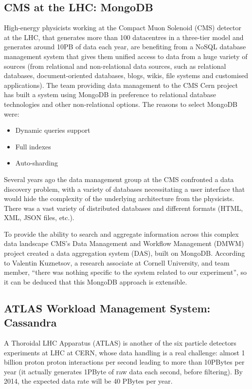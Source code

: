 \subsection{CMS at the LHC: MongoDB} %
\label{sub:cms_at_the_lhc_mongodb}
High-energy physicists working at the Compact Muon Solenoid (CMS) detector at the LHC, that generates more than 100 datacentres in a three-tier model and generates around 10PB of data each year, are benefiting from a NoSQL database management system that gives them unified access to data from a huge variety of sources (from relational and non-relational data sources, such as relational databases, document-oriented databases, blogs, wikis, file systems and customised applications). The team providing data management to the CMS Cern project has built a system using MongoDB in preference to relational database technologies and other non-relational options. The reasons to select MongoDB were:

\begin{itemize}
\item Dynamic queries support
\item Full indexes
\item Auto-sharding
\end{itemize}

Several years ago the data management group at the CMS confronted a data discovery problem, with a variety of databases necessitating a user interface that would hide the complexity of the underlying architecture from the physicists. There was a vast variety of distributed databases and different formats (HTML, XML, JSON files, etc.).

To provide the ability to search and aggregate information across this complex data landscape CMS's Data Management and Workflow Management (DMWM) project created a data aggregation system (DAS), built on MongoDB.  According to Valentin Kuznetsov, a research associate at Cornell University, and team member, ``there was nothing specific to the system related to our experiment'', so it can be deduced that this MongoDB approach is extensible. 


\subsection{ATLAS Workload Management System: Cassandra} %
\label{sub:atlas_workload_management_system_cassandra}

A Thoroidal LHC Apparatus (ATLAS) is another of the six particle detectors experiments at LHC at CERN, whose data handling is a real challenge: almost 1 billion proton proton interactions per second leading to more than 10PBytes per year (it actually generates 1PByte of raw data each second, before filtering). By 2014, the expected data rate will be 40 PBytes per year.

